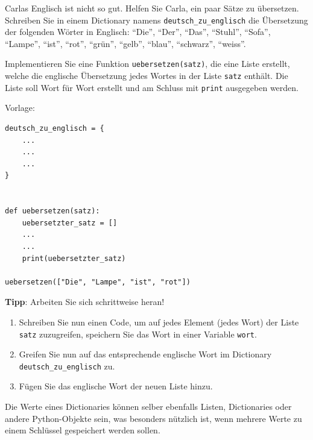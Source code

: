 \begin{myexercise}
	Carlas Englisch ist nicht so gut. Helfen Sie Carla, ein paar Sätze zu übersetzen. Schreiben Sie in einem Dictionary namens \lstinline|deutsch_zu_englisch| die Übersetzung der folgenden Wörter in Englisch: \enquote{Die}, \enquote{Der}, \enquote{Das}, \enquote{Stuhl}, \enquote{Sofa}, \enquote{Lampe}, \enquote{ist}, \enquote{rot}, \enquote{grün}, \enquote{gelb}, \enquote{blau}, \enquote{schwarz}, \enquote{weiss}.

	Implementieren Sie eine Funktion \lstinline|uebersetzen(satz)|, die eine Liste erstellt, welche die englische Übersetzung jedes Wortes in der Liste \lstinline|satz| enthält. Die Liste soll Wort für Wort erstellt und am Schluss mit \lstinline|print| ausgegeben werden.

	Vorlage:
	\begin{lstlisting}
deutsch_zu_englisch = {
    ...
    ...
    ...
}


def uebersetzen(satz):
    uebersetzter_satz = []
    ...
    ...
    print(uebersetzter_satz)

uebersetzen(["Die", "Lampe", "ist", "rot"])
\end{lstlisting}

	\textbf{Tipp}: Arbeiten Sie sich schrittweise heran! %

	\begin{enumerate}
		\item Schreiben Sie nun einen Code, um auf jedes Element (jedes Wort) der Liste \lstinline|satz| zuzugreifen, speichern Sie das Wort in einer Variable \lstinline|wort|.
		\item Greifen Sie nun auf das entsprechende englische Wort im Dictionary \lstinline|deutsch_zu_englisch| zu.
		\item Fügen Sie das englische Wort der neuen Liste hinzu.
	\end{enumerate}
	\begin{myanswer}
		
	\end{myanswer}
\end{myexercise}

Die Werte eines Dictionaries können selber ebenfalls Listen, Dictionaries oder andere Python-Objekte sein, was besonders nützlich ist, wenn mehrere Werte zu einem Schlüssel gespeichert werden sollen.

